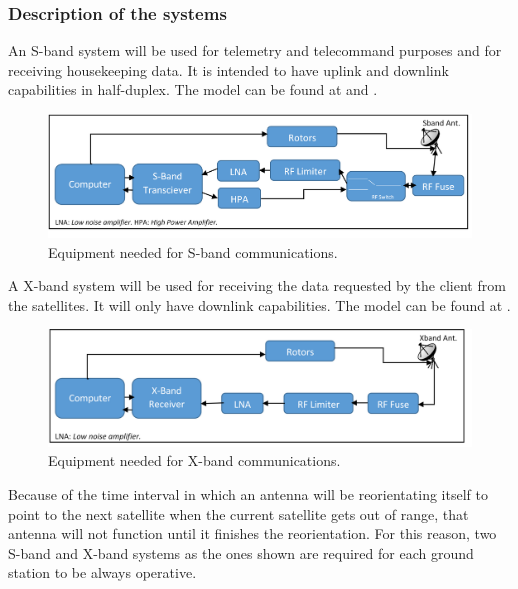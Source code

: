 \subsubsection{Description of the systems}
An S-band system will be used for telemetry and telecommand purposes and for receiving housekeeping data. It is intended to have uplink and downlink capabilities in half-duplex. The model can be found at \cite{SBand} and \cite{SBandDatasheet}.
\begin{figure}[H]
\begin{center}
\includegraphics[scale=0.1]{SbandEquip.PNG}
\caption[S-band Equipment]{Equipment needed for S-band communications.}
\label{fig:SbandEquip}
\end{center}
\end{figure}

A X-band system will be used for receiving the data requested by the client from the satellites. It will only have downlink capabilities. The model can be found at \cite{XBand}.
\begin{figure}[H]
\begin{center}
\includegraphics[scale=0.1]{XbandEquip.PNG}
\caption[X-band Equipment]{Equipment needed for X-band communications.}
\label{fig:XbandEquip}
\end{center}
\end{figure}

Because of the time interval in which an antenna will be reorientating itself to point to the next satellite when the current satellite gets out of range, that antenna will not function until it finishes the reorientation. For this reason, two S-band and X-band systems as the ones shown are required for each ground station to be always operative.

